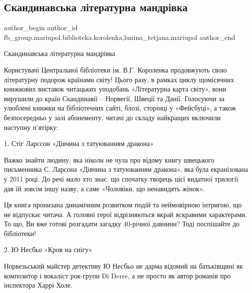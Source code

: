  
 
 
 
 

\subsection{Скандинавська літературна мандрівка}
\label{sec:01_08_2018.fb.fb_group.mariupol.biblioteka.korolenka.1.skandinavska_l_terat}
 
\ifcmt
 author_begin
   author_id fb_group.mariupol.biblioteka.korolenka,lunina_tetjana.mariupol
 author_end
\fi

Скандинавська літературна мандрівка

Користувачі Центральної бібліотеки ім. В.Г. Короленка продовжують свою
літературну подорож країнами світу! Цього разу, в рамках циклу щомісячних
книжкових виставок читацьких уподобань «Літературна карта світу», вони вирушили
до країн Скандинавії – Норвегії, Швеції та Данії. Голосуючи за улюблені книжки
на бібліотечних сайті, блозі, сторінці у «Фейсбуці», а також безпосередньо у
залі абонементу, читачі до складу найкращих включили наступну п'ятірку:

1. Стіг Ларссон «Дівчина з татуюванням дракона»

Важко знайти людину, яка ніколи не чула про відому книгу швецького письменника
С. Ларсона «Дівчина з татуюванням дракона», яка була екранізована у 2011 році.
До речі мало хто знає, що спочатку творець цієї видатної трилогії дав їй зовсім
іншу назву, а саме «Чоловіки, що ненавидять жінок». 

Ця книга пронизана динамічним розвитком подій та неймовірною інтригою, що не
відпускає читача. А головні герої відрізняються вкрай яскравими характерами. То
що, Ви вже готові розгадати загадку 40-річної давнини? Тоді поспішайте до
бібліотеки!

2.  Ю Несбьо «Кров на снігу»

Норвезьський майстер детективу Ю Несбьо не дарма відомий на батьківщині як
композитор і вокаліст рок-групи Di Derre, а не просто як автор романів про
інспектора Харрі Холе. 

